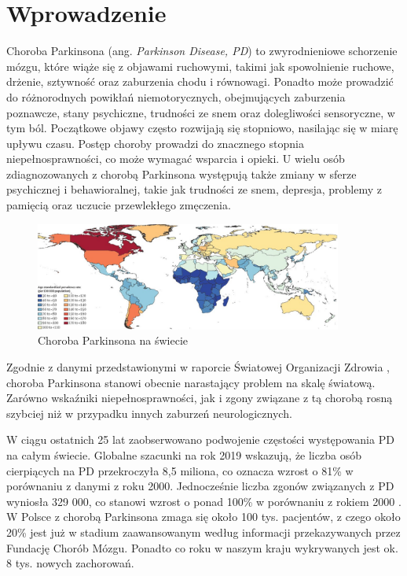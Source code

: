 \chapter{Wprowadzenie} \label{ch:wprowadzenie}

Choroba Parkinsona (ang. \emph {Parkinson Disease, PD}) to zwyrodnieniowe schorzenie mózgu, które wiąże się z objawami ruchowymi, takimi jak spowolnienie ruchowe,
drżenie, sztywność oraz zaburzenia chodu i równowagi.
Ponadto może prowadzić do różnorodnych powikłań niemotorycznych, obejmujących zaburzenia poznawcze, stany psychiczne,
trudności ze snem oraz dolegliwości sensoryczne, w tym ból.
Początkowe objawy często rozwijają się stopniowo, nasilając się w miarę upływu czasu.
Postęp choroby prowadzi do znacznego stopnia niepełnosprawności, co może wymagać wsparcia i opieki.
U wielu osób zdiagnozowanych z chorobą Parkinsona występują także zmiany w sferze psychicznej i behawioralnej, takie jak
trudności ze snem, depresja, problemy z pamięcią oraz uczucie przewlekłego zmęczenia.

\begin{figure}[htbp]
	\centering
	\includegraphics[width=0.9\textwidth]{./img/map}
	\caption{Choroba Parkinsona na świecie \cite{global_PD}}
    \label{fig:PD_map}
\end{figure}

Zgodnie z danymi przedstawionymi w raporcie Światowej Organizacji Zdrowia \cite{WHO}, choroba Parkinsona stanowi obecnie narastający problem na skalę światową. Zarówno wskaźniki niepełnosprawności, jak i zgony związane z tą chorobą rosną szybciej niż w przypadku innych zaburzeń neurologicznych.

W ciągu ostatnich 25 lat zaobserwowano podwojenie częstości występowania PD na całym świecie.
Globalne szacunki na rok 2019 wskazują, że liczba osób cierpiących na PD przekroczyła 8,5 miliona, co oznacza wzrost o 81\% w porównaniu z danymi z roku 2000.
Jednocześnie liczba zgonów związanych z PD wyniosła 329 000, co stanowi wzrost o ponad 100\% w porównaniu z rokiem 2000 \cite{global_PD}.
W Polsce z chorobą Parkinsona zmaga się około 100 tys. pacjentów, z czego około 20\% jest już w stadium zaawansowanym
według informacji przekazywanych przez Fundację Chorób Mózgu.
Ponadto co roku w naszym kraju wykrywanych jest ok. 8 tys. nowych zachorowań.

